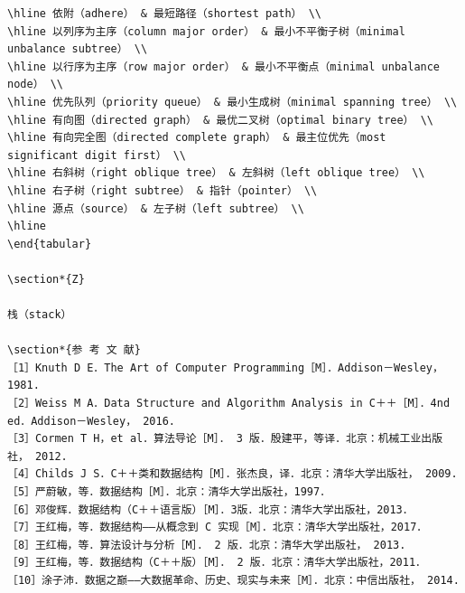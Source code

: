 \documentclass[10pt]{article}
\begin{document}
\begin{verbatim}
\hline 依附（adhere） & 最短路径（shortest path） \\
\hline 以列序为主序（column major order） & 最小不平衡子树（minimal unbalance subtree） \\
\hline 以行序为主序（row major order） & 最小不平衡点（minimal unbalance node） \\
\hline 优先队列（priority queue） & 最小生成树（minimal spanning tree） \\
\hline 有向图（directed graph） & 最优二叉树（optimal binary tree） \\
\hline 有向完全图（directed complete graph） & 最主位优先（most significant digit first） \\
\hline 右斜树（right oblique tree） & 左斜树（left oblique tree） \\
\hline 右子树（right subtree） & 指针（pointer） \\
\hline 源点（source） & 左子树（left subtree） \\
\hline
\end{tabular}

\section*{Z}

栈（stack）

\section*{参 考 文 献}
［1］Knuth D E．The Art of Computer Programming［M］．Addison－Wesley， 1981.
［2］Weiss M A．Data Structure and Algorithm Analysis in C＋＋［M］．4nd ed．Addison－Wesley， 2016.
［3］Cormen T H，et al．算法导论［M］． 3 版．殷建平，等译．北京：机械工业出版社， 2012.
［4］Childs J S．C＋＋类和数据结构［M］．张杰良，译．北京：清华大学出版社， 2009.
［5］严蔚敏，等．数据结构［M］．北京：清华大学出版社，1997．
［6］邓俊辉．数据结构（C＋＋语言版）［M］．3版．北京：清华大学出版社，2013．
［7］王红梅，等．数据结构——从概念到 C 实现［M］．北京：清华大学出版社，2017．
［8］王红梅，等．算法设计与分析［M］． 2 版．北京：清华大学出版社， 2013.
［9］王红梅，等．数据结构（C＋＋版）［M］． 2 版．北京：清华大学出版社，2011．
［10］涂子沛．数据之巅——大数据革命、历史、现实与未来［M］．北京：中信出版社， 2014.
\end{verbatim}
\end{document}
